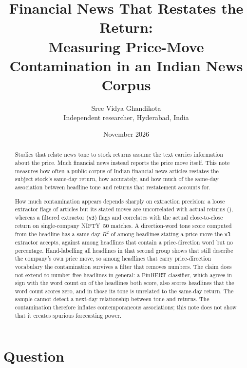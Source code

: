 \documentclass[11pt]{article}
\title{Financial News That Restates the Return:\\
Measuring Price-Move Contamination in an Indian News Corpus}
\author{Sree Vidya Ghandikota\\[2pt] \normalsize Independent researcher, Hyderabad, India}
\date{November 2026}
\begin{document}
\maketitle

\begin{abstract}
\noindent Studies that relate news tone to stock returns assume the text carries information about the price. Much financial news instead reports the price move itself. This note measures how often a public corpus of \nArticles{} Indian financial news articles restates the subject stock's same-day return, how accurately, and how much of the same-day association between headline tone and returns that restatement accounts for.

How much contamination appears depends sharply on extraction precision: a loose extractor flags \flagLoose{} of articles but its stated moves are uncorrelated with actual returns (\corrLoose{}), whereas a filtered extractor (\texttt{v3}) flags \flagVthree{} and correlates \corrVthree{} with the actual close-to-close return on single-company NIFTY~50 matches. A direction-word tone score computed from the headline has a same-day $R^2$ of \toneRsqVthree{} among headlines stating a price move the \texttt{v3} extractor accepts, against \toneRsqNoPct{} among headlines that contain a price-direction word but no percentage. Hand-labelling all \nLabelled{} headlines in that second group shows that \shareLabMove{} still describe the company's own price move, so among headlines that carry price-direction vocabulary the contamination survives a filter that removes numbers. The claim does not extend to number-free headlines in general: a FinBERT classifier, which agrees in sign with the word count on \fbAgree{} of the headlines both score, also scores \fbOnlyN{} headlines that the word count scores zero, and in those its tone is unrelated to the same-day return. The sample cannot detect a next-day relationship between tone and returns. The contamination therefore inflates contemporaneous associations; this note does not show that it creates spurious forecasting power.
\end{abstract}

\section{Question}
\end{document}
